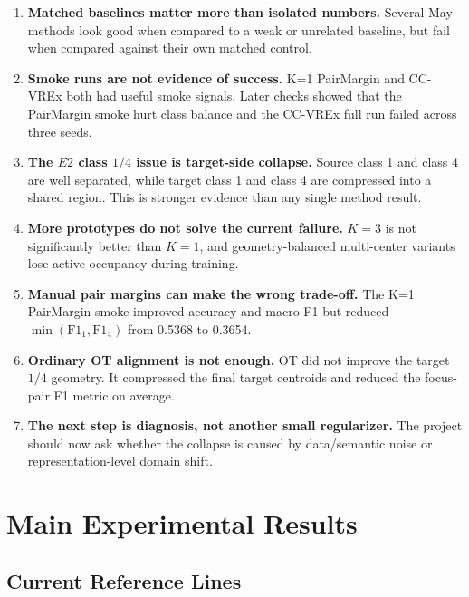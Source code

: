\documentclass[11pt]{article}
\begin{document}
\begin{enumerate}[leftmargin=*]
    \item \textbf{Matched baselines matter more than isolated numbers.} Several May methods look good when compared to a weak or unrelated baseline, but fail when compared against their own matched control.

    \item \textbf{Smoke runs are not evidence of success.} K=1 PairMargin and CC-VREx both had useful smoke signals. Later checks showed that the PairMargin smoke hurt class balance and the CC-VREx full run failed across three seeds.

    \item \textbf{The $E2$ class $1/4$ issue is target-side collapse.} Source class 1 and class 4 are well separated, while target class 1 and class 4 are compressed into a shared region. This is stronger evidence than any single method result.

    \item \textbf{More prototypes do not solve the current failure.} $K=3$ is not significantly better than $K=1$, and geometry-balanced multi-center variants lose active occupancy during training.

    \item \textbf{Manual pair margins can make the wrong trade-off.} The K=1 PairMargin smoke improved accuracy and macro-F1 but reduced $\min(\mathrm{F1}_1,\mathrm{F1}_4)$ from 0.5368 to 0.3654.

    \item \textbf{Ordinary OT alignment is not enough.} OT did not improve the target $1/4$ geometry. It compressed the final target centroids and reduced the focus-pair F1 metric on average.

    \item \textbf{The next step is diagnosis, not another small regularizer.} The project should now ask whether the collapse is caused by data/semantic noise or representation-level domain shift.
\end{enumerate}

\section{Main Experimental Results}

\subsection{Current Reference Lines}
\end{document}
